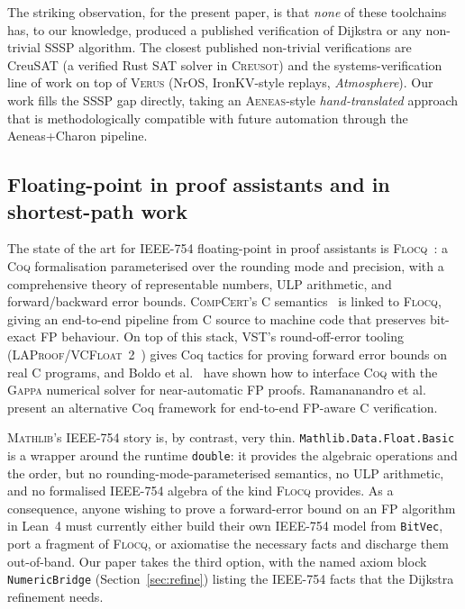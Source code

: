\documentclass[11pt,a4paper]{article}
\providecommand{\cref}[1]{Section~\ref{#1}}
\newcommand{\Lean}{Lean~4\xspace}
\newcommand{\Mathlib}{\textsc{Mathlib}\xspace}
\newcommand{\Dijkstra}{Dijkstra\xspace}
\newcommand{\code}[1]{\texttt{#1}}
\theoremstyle{plain}
\theoremstyle{definition}
\begin{document}
The striking observation, for the present paper, is that \emph{none} of
these toolchains has, to our knowledge, produced a published verification
of \Dijkstra{} or any non-trivial SSSP algorithm. The closest published
non-trivial verifications are CreuSAT (a verified Rust SAT solver in
\textsc{Creusot}) and the systems-verification line of work on top of
\textsc{Verus} (NrOS, IronKV-style replays, \emph{Atmosphere}). Our work
fills the SSSP gap directly, taking an \textsc{Aeneas}-style
\emph{hand-translated} approach that is methodologically compatible with
future automation through the Aeneas+Charon pipeline.

\subsection{Floating-point in proof assistants and in shortest-path
work}\label{sec:rel-fp}

The state of the art for IEEE-754 floating-point in proof assistants is
\textsc{Flocq}~\cite{BoldoMelquiond2011Flocq,BoldoMelquiond2017Book}: a
\textsc{Coq} formalisation parameterised over the rounding mode and
precision, with a comprehensive theory of representable numbers, ULP
arithmetic, and forward/backward error bounds.
\textsc{CompCert}'s C semantics~\cite{BoldoJourdanLeroyMelquiond2014} is
linked to \textsc{Flocq}, giving an end-to-end pipeline from C source to
machine code that preserves bit-exact FP behaviour. On top of this stack,
\textsc{VST}'s round-off-error tooling
(\textsc{LAProof}/\textsc{VCFloat~2}~\cite{KellisonAppelBertotTassarotti2024VCFloat2})
gives Coq tactics for proving forward error bounds on real C programs,
and Boldo et al.~\cite{BoldoFilliatreMelquiond2009Gappa} have shown how to
interface \textsc{Coq} with the \textsc{Gappa} numerical solver for
near-automatic FP proofs. Ramananandro et
al.~\cite{Ramananandro2016CPP} present an alternative Coq framework for
end-to-end FP-aware C verification.

\Mathlib's IEEE-754 story is, by contrast, very thin.
\code{Mathlib.Data.Float.Basic}~\cite{LeanFloat} is a wrapper around the
runtime \code{double}: it provides the algebraic operations and the
order, but no rounding-mode-parameterised semantics, no
ULP arithmetic, and no formalised IEEE-754 algebra of the kind \textsc{Flocq}
provides. As a consequence, anyone wishing to prove a forward-error bound on
an FP algorithm in \Lean{} must currently either build their own IEEE-754
model from \code{BitVec}, port a fragment of \textsc{Flocq}, or
axiomatise the necessary facts and discharge them out-of-band. Our paper
takes the third option, with the named axiom block
\code{NumericBridge} (\cref{sec:refine}) listing the IEEE-754 facts that
the Dijkstra refinement needs.
\end{document}

